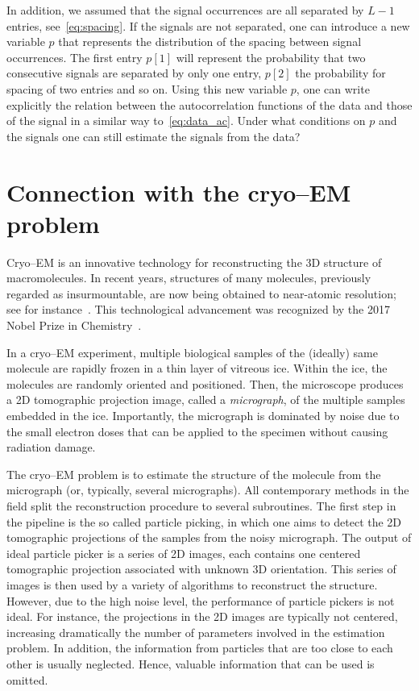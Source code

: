 \documentclass[english,11pt]{article}
\numberwithin{equation}{section}
\theoremstyle{plain}
\theoremstyle{definition}
\theoremstyle{remark}
\theoremstyle{plain}
\theoremstyle{remark}
\theoremstyle{plain}
\theoremstyle{plain}
\begin{document}
In addition, we assumed that the signal occurrences are all separated by $L-1$ entries, see~\eqref{eq:spacing}. If the signals are not separated, one can introduce a new variable $p$ that represents the distribution of the spacing between signal occurrences. The first entry $p[1]$ will represent the probability that two consecutive signals are separated by only one entry, $p[2]$ the probability for spacing of two entries and so on. Using this new variable $p$, one can write explicitly the relation between the autocorrelation functions of the data and those of the signal in a similar way to~\eqref{eq:data_ac}. Under what conditions on $p$ and the signals one can still estimate the signals from the data?


\section{Connection with the cryo--EM problem}	

Cryo--EM is an innovative technology for reconstructing the 3D structure of macromolecules. In recent years, structures
of many molecules, previously regarded as insurmountable, are now being
obtained to near-atomic resolution; see for instance~\cite{kuhlbrandt2014resolution,bartesaghi20152}. This technological advancement was recognized by the 2017 Nobel Prize in Chemistry~\cite{nobel}. 

In a cryo--EM experiment, multiple biological samples of the (ideally) same molecule are rapidly frozen in a thin layer of vitreous ice. Within the ice, the molecules are randomly oriented and positioned. Then,  the microscope produces a 2D tomographic projection image, called a \emph{micrograph}, of the multiple samples embedded in the ice. Importantly, the micrograph is dominated by noise due to the small electron doses that
can be applied to the specimen without causing radiation damage.

The cryo--EM problem is to estimate the structure of the molecule from the micrograph (or, typically, several micrographs). 
All contemporary methods in the field split the reconstruction procedure to several subroutines. 
The first step in the pipeline is the so called particle picking, in which one aims to detect the 2D tomographic projections of the samples from the noisy micrograph. The output of ideal particle picker is a series of 2D images, each contains one centered tomographic projection associated with unknown 3D orientation. This series of images 
 is then used by a variety of algorithms to reconstruct the structure. 
However, due to the high noise level, the performance of particle pickers  is not ideal. For instance, the projections in the 2D images are typically not centered, increasing dramatically the number of parameters involved in the estimation problem. In addition, the information from particles that are too close to each other is usually neglected. Hence, valuable information that can be used is omitted. 
\end{document}
